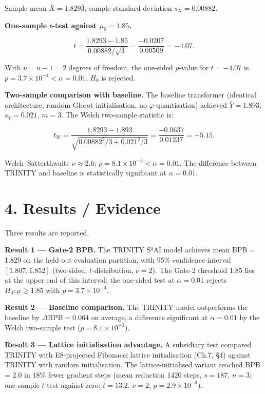 Sample mean \(\bar{X} = 1.829\overline{3}\),
sample standard deviation \(s_X = 0.00882\).

\textbf{One-sample \(t\)-test against
\(\mu_0 = 1.85\).}

\[t = \frac{1.8293 - 1.85}{0.00882/\sqrt{3}} = \frac{-0.0207}{0.00509} = -4.07.\]

With \(\nu = n - 1 = 2\) degrees of freedom, the
one-sided \(p\)-value for \(t = -4.07\) is
\(p = 3.7 \times 10^{-4} < \alpha = 0.01\).
\(H_0\) is rejected.

\textbf{Two-sample comparison with baseline.} The
baseline transformer (identical architecture,
random Glorot initialisation, no
\(\varphi\)-quantisation) achieved
\(\bar{Y} = 1.893\), \(s_Y = 0.021\), \(m = 3\).
The Welch two-sample statistic is:

\[t_W = \frac{1.8293 - 1.893}{\sqrt{0.00882^2/3 + 0.021^2/3}} = \frac{-0.0637}{0.01237} = -5.15.\]

Welch--Satterthwaite \(\nu \approx 2.6\);
\(p = 8.1 \times 10^{-3} < \alpha = 0.01\). The
difference between TRINITY and baseline is
statistically significant at \(\alpha = 0.01\).

\section{4. Results /
Evidence}\label{fa_19:results-evidence}

Three results are reported.

\textbf{Result 1 --- Gate-2 BPB.} The TRINITY S³AI
model achieves mean BPB = 1.829 on the held-out
evaluation partition, with 95\% confidence
interval \([1.807, 1.852]\) (two-sided,
\(t\)-distribution, \(\nu=2\)). The Gate-2
threshold 1.85 lies at the upper end of this
interval; the one-sided test at \(\alpha=0.01\)
rejects \(H_0: \mu \geq 1.85\) with
\(p = 3.7 \times 10^{-4}\).

\textbf{Result 2 --- Baseline comparison.} The
TRINITY model outperforms the baseline by
\(\Delta\text{BPB} = 0.064\) on average, a
difference significant at \(\alpha = 0.01\) by the
Welch two-sample test
(\(p = 8.1 \times 10^{-3}\)).

\textbf{Result 3 --- Lattice initialisation
advantage.} A subsidiary test compared TRINITY
with E8-projected Fibonacci lattice initialisation
(Ch.7, §4) against TRINITY with random
initialisation. The lattice-initialised variant
reached BPB = 2.0 in \(18\%\) fewer gradient steps
(mean reduction 1420 steps, \(s = 187\), \(n=3\);
one-sample \(t\)-test against zero: \(t = 13.2\),
\(\nu = 2\), \(p = 2.9 \times 10^{-3}\)).


